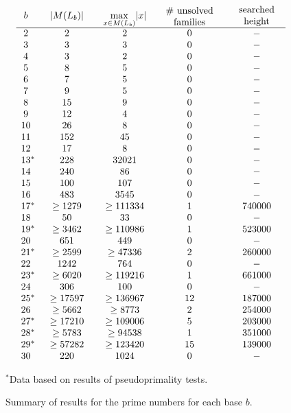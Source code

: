 \documentclass[12pt]{article}
\theoremstyle{plain}
\theoremstyle{definition}
\newcommand{\0}{\mathtt{0}}
\newcommand{\1}{\mathtt{1}}
\newcommand{\2}{\mathtt{2}}
\newcommand{\3}{\mathtt{3}}
\newcommand{\4}{\mathtt{4}}
\newcommand{\5}{\mathtt{5}}
\newcommand{\6}{\mathtt{6}}
\newcommand{\7}{\mathtt{7}}
\newcommand{\8}{\mathtt{8}}
\newcommand{\9}{\mathtt{9}}
\begin{document}
\begin{figure}\[\begin{array}{c@{\qquad}c@{\qquad}c@{\qquad}c@{\qquad}c}
b & \lvert M(L_b)\rvert & \max\limits_{x\in M(L_b)}\lvert x\rvert & \parbox{5em}{\centering\# unsolved\\families} & \parbox{5em}{\centering searched height} \\ \hline
2 & 2 & 2 & 0 & - \\ 
3 & 3 & 3 & 0 & - \\ 
4 & 3 & 2 & 0 & - \\ 
5 & 8 & 5 & 0 & - \\ 
6 & 7 & 5 & 0 & - \\ 
7 & 9 & 5 & 0 & - \\ 
8 & 15 & 9 & 0 & - \\ 
9 & 12 & 4 & 0 & - \\ 
10 & 26 & 8 & 0 & - \\ 
11 & 152 & 45 & 0 & - \\ 
12 & 17 & 8 & 0 & - \\ 
13\mathrlap{^*} & 228 & 32021 & 0 & - \\ 
14 & 240 & 86 & 0 & - \\ 
15 & 100 & 107 & 0 & - \\ 
16 & 483 & 3545 & 0 & - \\ 
17\mathrlap{^*} & \geq1279 & \geq111334 & 1 & 740000 \\ 
18 & 50 & 33 & 0 & - \\ 
19\mathrlap{^*} & \geq3462 & \geq110986 & 1 & 523000 \\ 
20 & 651 & 449 & 0 & - \\ 
21\mathrlap{^*} & \geq2599 & \geq47336 & 2 & 260000 \\ 
22 & 1242 & 764 & 0 & - \\ 
23\mathrlap{^*} & \geq6020 & \geq119216 & 1 & 661000 \\ 
24 & 306 & 100 & 0 & - \\ 
25\mathrlap{^*} & \geq17597 & \geq136967 & 12 & 187000 \\ 
26 & \geq5662 & \geq8773 & 2 & 254000 \\ 
27\mathrlap{^*} & \geq17210 & \geq109006 & 5 & 203000 \\ 
28\mathrlap{^*} & \geq5783 & \geq94538 & 1 & 351000 \\
29\mathrlap{^*} & \geq57282 & \geq123420 & 15 & 139000 \\
30 & 220 & 1024 & 0 & -
\end{array}\]
\begin{center}$^*$Data based on results of pseudoprimality tests.\end{center}
\caption{Summary of results for the prime numbers for each base $b$.}
\label{resultsfig}
\end{figure}
\end{document}
